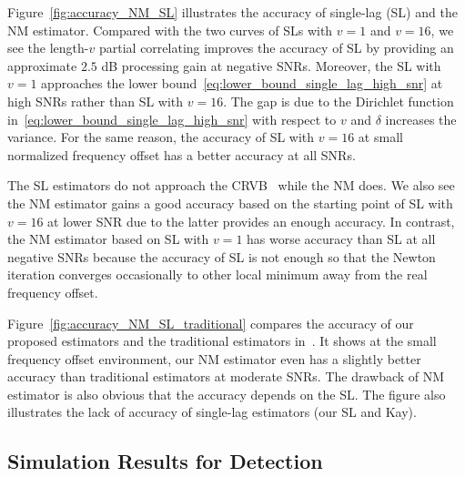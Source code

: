 Figure~\ref{fig:accuracy_NM_SL} illustrates the accuracy of single-lag (SL) and the NM estimator.
Compared with the two curves of SLs with $v{=}1$ and $v{=}16$, we see the length-$v$ partial correlating
improves the accuracy of SL by providing an approximate $2.5$ dB processing gain at negative SNRs.
Moreover, the SL with $v{=}1$ approaches the lower bound~\eqref{eq:lower_bound_single_lag_high_snr} at high SNRs
rather than SL with $v{=}16$. The gap is due to the Dirichlet function in~\eqref{eq:lower_bound_single_lag_high_snr} with respect to $v$ and $\delta$
increases the variance. For the same reason, the accuracy of SL with $v{=}16$ at small normalized frequency offset
has a better accuracy at all SNRs.

The SL estimators do not approach the CRVB~\cite{Gini_98} while the NM does. We also see the NM estimator gains 
a good accuracy based on the starting point of SL with $v{=}16$ at lower SNR due to the latter provides
an enough accuracy. In contrast, the NM estimator based on SL with $v{=}1$ has worse accuracy than SL 
at all negative SNRs because the accuracy of SL is not enough so that the Newton iteration converges occasionally to 
other local minimum away from the real frequency offset.

Figure~\ref{fig:accuracy_NM_SL_traditional} compares the accuracy of our proposed estimators
and the traditional estimators in~\cite{kay_89,Fitz_94,Luise_Reggiannini_95}. It shows at the small frequency offset environment,
our NM estimator even has a slightly better accuracy than traditional estimators at moderate SNRs.
The drawback of NM estimator is also obvious that the accuracy depends on the SL.
The figure also illustrates the lack of accuracy of single-lag estimators (our SL and Kay).

\subsection{Simulation Results for Detection}



